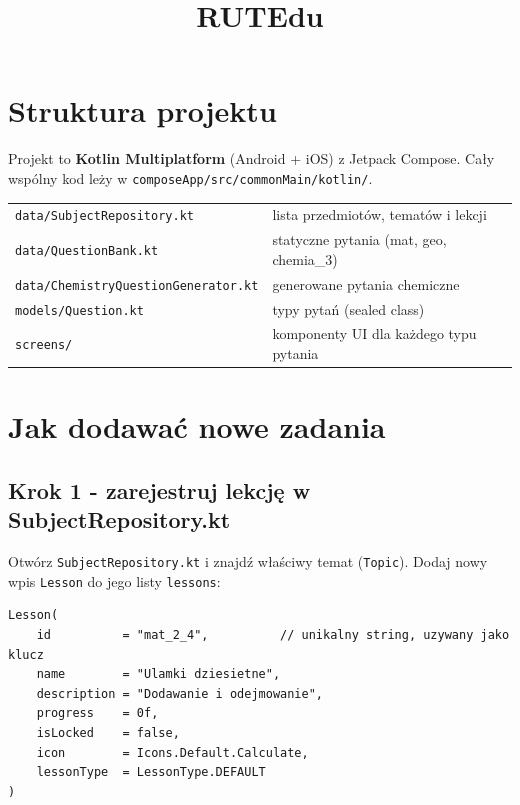 \documentclass[a4paper,11pt]{article}
\title{\textbf{RUTEdu}}
\author{}
\date{}
\begin{document}
\maketitle
\tableofcontents
\vspace{1em}

\section{Struktura projektu}

Projekt to \textbf{Kotlin Multiplatform} (Android + iOS) z Jetpack Compose.
Cały wspólny kod leży w \texttt{composeApp/src/commonMain/kotlin/}.

\begin{center}
\begin{tabular}{ll}
\texttt{data/SubjectRepository.kt} & lista przedmiotów, tematów i lekcji \\
\texttt{data/QuestionBank.kt}      & statyczne pytania (mat, geo, chemia\_3) \\
\texttt{data/ChemistryQuestionGenerator.kt} & generowane pytania chemiczne \\
\texttt{models/Question.kt}        & typy pytań (sealed class) \\
\texttt{screens/}                  & komponenty UI dla każdego typu pytania \\
\end{tabular}
\end{center}

\section{Jak dodawać nowe zadania}

\subsection{Krok 1 - zarejestruj lekcję w SubjectRepository.kt}

Otwórz \texttt{SubjectRepository.kt} i znajdź właściwy temat (\texttt{Topic}).
Dodaj nowy wpis \texttt{Lesson} do jego listy \texttt{lessons}:

\begin{lstlisting}
Lesson(
    id          = "mat_2_4",          // unikalny string, uzywany jako klucz
    name        = "Ulamki dziesietne",
    description = "Dodawanie i odejmowanie",
    progress    = 0f,
    isLocked    = false,
    icon        = Icons.Default.Calculate,
    lessonType  = LessonType.DEFAULT
)
\end{lstlisting}
\end{document}
